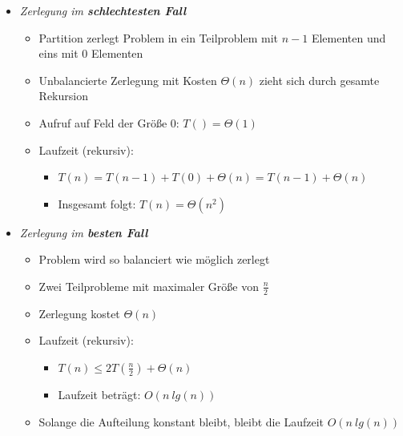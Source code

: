 \documentclass[
    ngerman,
    color=3b,
    load_common, %
    summary,
    boxarc,
]{tuda_summary}
\begin{document}
\begin{itemize}
\begin{itemize}
              \item \textit{Zerlegung im \textbf{schlechtesten Fall}}
                    \begin{itemize}
                        \item Partition zerlegt Problem in ein Teilproblem mit $n-1$ Elementen und eins mit $0$ Elementen
                        \item Unbalancierte Zerlegung mit Kosten $\Theta(n)$ zieht sich durch gesamte Rekursion
                        \item Aufruf auf Feld der Größe 0: $T() = \Theta(1)$
                        \item Laufzeit (rekursiv):
                              \begin{itemize}
                                  \item $T(n) = T(n-1) + T(0) + \Theta(n) = T(n-1) + \Theta(n)$
                                  \item Insgesamt folgt: $T(n) = \Theta(n^2)$
                              \end{itemize}
                    \end{itemize}

              \item \textit{Zerlegung im \textbf{besten Fall}}
                    \begin{itemize}
                        \item Problem wird so balanciert wie möglich zerlegt
                        \item Zwei Teilprobleme mit maximaler Größe von $\frac{n}{2}$
                        \item Zerlegung kostet $\Theta(n)$
                        \item Laufzeit (rekursiv):
                              \begin{itemize}
                                  \item $T(n) \leq 2T(\frac{n}{2}) + \Theta(n)$
                                  \item Laufzeit beträgt: $O(n~lg(n))$
                              \end{itemize}
                        \item Solange die Aufteilung konstant bleibt, bleibt die Laufzeit $O(n~lg(n))$
                    \end{itemize}

          \end{itemize}
\end{itemize}
\clearpage
\end{document}
